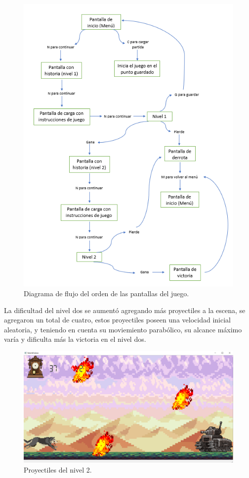 \documentclass{article}
\begin{document}
\newpage
\begin{figure}[h]
\includegraphics[scale=1.1]{Images/diagramaflujopantallas.png}
\centering
\caption{Diagrama de flujo del orden de las pantallas del juego.}
\label{fig:diagramaflujo}
\end{figure}

La dificultad del nivel dos se aumentó agregando más proyectiles a la escena, se agregaron un total de cuatro, estos proyectiles poseen una velocidad inicial aleatoria, y teniendo en cuenta su moviemiento parabólico, su alcance máximo varía y dificulta más la victoria en el nivel dos.

\newpage
\begin{figure}[h]
\includegraphics[scale=0.4]{Images/nivel2proyectiles.png}
\centering
\caption{Proyectiles del nivel 2.}
\label{fig:nivel2proy}
\end{figure}
\end{document}
